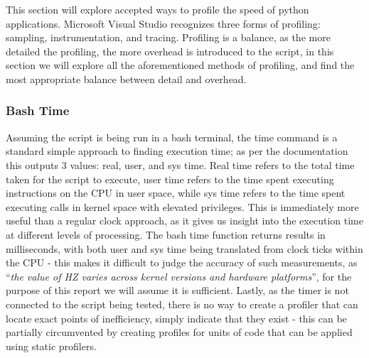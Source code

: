 This section will explore accepted ways to profile the speed of python applications.
Microsoft Visual Studio recognizes three forms of profiling: sampling, instrumentation, and
tracing\cite{MicrosoftProfilingTechniques}.
Profiling is a balance, as the more detailed the profiling, the more overhead is introduced to the script, in this
section we will explore all the aforementioned methods of profiling, and find the most appropriate
balance between detail and overhead.

\subsubsection{Bash Time}\label{subsubsec:bash_time}
Assuming the script is being run in a bash terminal, the time command\cite{BashTime} is a standard
simple approach to finding execution time; as per the documentation this outputs 3 values: real, user, and sys time.
Real time refers to the total time taken for the script to execute, user time refers to the time spent executing
instructions on the CPU in user space, while sys time refers to the time spent executing calls in kernel space with
elevated privileges.
This is immediately more useful than a regular clock approach, as it gives us insight into the execution time at
different levels of processing.
The bash time function returns results in milliseconds, with both user and sys time being translated from clock ticks
within the CPU - this makes it difficult to judge the accuracy of such measurements, as ``\textit{the value of HZ varies
across kernel versions and hardware platforms}''\cite{BashTimeClock}, for the purpose of this report we will assume it is
sufficient.
Lastly, as the timer is not connected to the script being tested, there is no way to create a profiler that can locate
exact points of inefficiency, simply indicate that they exist - this can be partially circumvented by creating
profiles for units of code that can be applied using static profilers.

